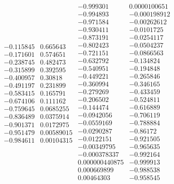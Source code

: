 \documentclass[prettycode,shellescape]{watsonbook}
\begin{document}
\begin{aexercise}
{$$\begin{array}{cc}
      -0.115845 & 0.665643 \\
      -0.171601 & 0.574651 \\
      -0.238745 & 0.482473 \\
      -0.315899 & 0.392595 \\
      -0.400957 & 0.30818 \\
      -0.491197 & 0.231899 \\
      -0.583415 & 0.165791 \\
      -0.674106 & 0.111162 \\
      -0.759645 & 0.0685255 \\
      -0.836489 & 0.0375914 \\
      -0.901371 & 0.0172975 \\
      -0.951479 & 0.00589015 \\
      -0.984611 & 0.00104315 
    \end{array}
    \begin{array}{cc}
      -0.999301 & 0.0000100651 \\
      -0.994893 & -0.000198912 \\
      -0.971584 & -0.00262612 \\
      -0.930411 & -0.0101725 \\
      -0.873191 & -0.0254117 \\
      -0.802423 & -0.0504237 \\
      -0.721151 & -0.0866563 \\
      -0.632792 & -0.134824 \\
      -0.540951 & -0.194848 \\
      -0.449221 & -0.265846 \\
      -0.360994 & -0.346165 \\
      -0.279269 & -0.433459 \\
      -0.206502 & -0.524811 \\
      -0.144474 & -0.616889 \\
      -0.0942056 & -0.706119 \\
      -0.0559169 & -0.788884 \\
      -0.0290287 & -0.86172 \\
      -0.0122151 & -0.921505 \\
      -0.00349795 & -0.965635 \\
      -0.000378337 & -0.992164 \\
      0.000000440875 & -0.999913 \\
      0.000669899 & -0.988538 \\
      0.00464303 & -0.958545 \\

\end{array}$$}
\end{aexercise}
\end{document}
